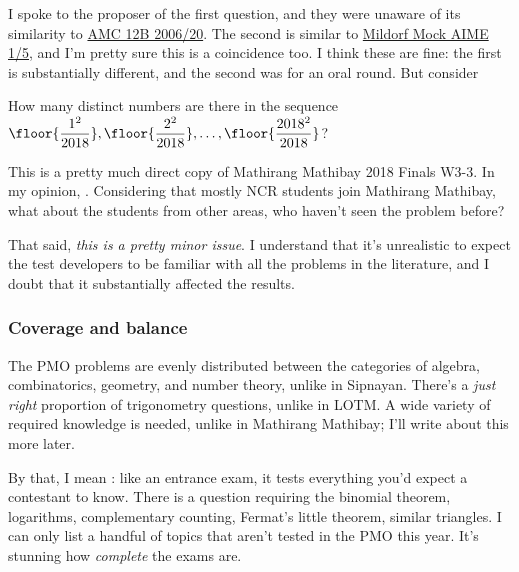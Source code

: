 \documentclass[11pt,paper=letter]{scrartcl}
\begin{document}
I spoke to the proposer of the first question, and they were unaware of its similarity to \href{https://artofproblemsolving.com/wiki/index.php/2006_AMC_12B_Problems/Problem_20}{AMC 12B 2006/20}. The second is similar to \href{http://services.artofproblemsolving.com/download.php?id=YXR0YWNobWVudHMvYy80LzBkNzcyN2M0ZmJkYjhiMTAxZjA1NGZjZWIyYzBjZmE4ZTJmNmVk&rn=VGhvbWFzTWlsZG9yZkFpbWVzLnBkZg==}{Mildorf Mock AIME 1/5}, and I'm pretty sure this is a coincidence too. I think these are fine: the first is substantially different, and the second was for an oral round. But consider

\begin{probboxed}
  [Areas I19] How many distinct numbers are there in the sequence $\floor{\dfrac{1^2}{2018}}, \floor{\dfrac{2^2}{2018}}, \ldots, \floor{\dfrac{2018^2}{2018}}$?
\end{probboxed}

This is a pretty much direct copy of Mathirang Mathibay 2018 Finals W3-3. In my opinion, . Considering that mostly NCR students join Mathirang Mathibay, what about the students from other areas, who haven't seen the problem before?

That said, \emph{this is a pretty minor issue}. I understand that it's unrealistic to expect the test developers to be familiar with all the problems in the literature, and I doubt that it substantially affected the results.

\subsubsection*{Coverage and balance}

The PMO problems are evenly distributed between the categories of algebra, combinatorics, geometry, and number theory, unlike in Sipnayan. There's a \emph{just right} proportion of trigonometry questions, unlike in LOTM. A wide variety of required knowledge is needed, unlike in Mathirang Mathibay; I'll write about this more later.

By that, I mean : like an entrance exam, it tests everything you'd expect a contestant to know. There is a question requiring the binomial theorem, logarithms, complementary counting, Fermat's little theorem, similar triangles. I can only list a handful of topics that aren't tested in the PMO this year. It's stunning how \emph{complete} the exams are.
\end{document}

